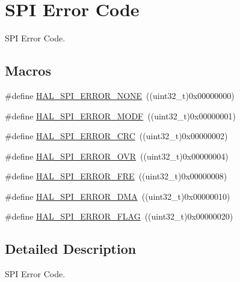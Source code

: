 \hypertarget{group___s_p_i___error___code}{}\section{S\+PI Error Code}
\label{group___s_p_i___error___code}


S\+PI Error Code.  


\subsection*{Macros}
\begin{DoxyCompactItemize}
\item 
\#define \hyperlink{group___s_p_i___error___code_gaac0006cdf5670741f8702e55d4bf4601}{H\+A\+L\+\_\+\+S\+P\+I\+\_\+\+E\+R\+R\+O\+R\+\_\+\+N\+O\+NE}~((uint32\+\_\+t)0x00000000)
\item 
\#define \hyperlink{group___s_p_i___error___code_ga75f5edd4e2a7a95bc9a994244df52460}{H\+A\+L\+\_\+\+S\+P\+I\+\_\+\+E\+R\+R\+O\+R\+\_\+\+M\+O\+DF}~((uint32\+\_\+t)0x00000001)
\item 
\#define \hyperlink{group___s_p_i___error___code_gad1163823ec5fa89e4670366565d4ab93}{H\+A\+L\+\_\+\+S\+P\+I\+\_\+\+E\+R\+R\+O\+R\+\_\+\+C\+RC}~((uint32\+\_\+t)0x00000002)
\item 
\#define \hyperlink{group___s_p_i___error___code_ga9587f998fed196a4f30c38f2da731c0f}{H\+A\+L\+\_\+\+S\+P\+I\+\_\+\+E\+R\+R\+O\+R\+\_\+\+O\+VR}~((uint32\+\_\+t)0x00000004)
\item 
\#define \hyperlink{group___s_p_i___error___code_gaf03238e57dd0c4d277fef2aa7a083133}{H\+A\+L\+\_\+\+S\+P\+I\+\_\+\+E\+R\+R\+O\+R\+\_\+\+F\+RE}~((uint32\+\_\+t)0x00000008)
\item 
\#define \hyperlink{group___s_p_i___error___code_gaaf91992131301e3fc7f2ce62fb011f6c}{H\+A\+L\+\_\+\+S\+P\+I\+\_\+\+E\+R\+R\+O\+R\+\_\+\+D\+MA}~((uint32\+\_\+t)0x00000010)
\item 
\#define \hyperlink{group___s_p_i___error___code_ga777b36b52caf926a384976baf34530a3}{H\+A\+L\+\_\+\+S\+P\+I\+\_\+\+E\+R\+R\+O\+R\+\_\+\+F\+L\+AG}~((uint32\+\_\+t)0x00000020)
\end{DoxyCompactItemize}


\subsection{Detailed Description}
S\+PI Error Code. 



